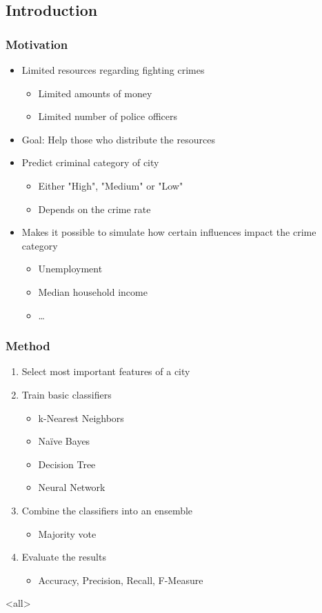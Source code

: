 \mode*

\begin{frame}
  \section{Introduction}
  \frametitle{Motivation}
  \begin{itemize}
    \item Limited resources regarding fighting crimes
      \begin{itemize}
        \item Limited amounts of money
        \item Limited number of police officers
      \end{itemize}
    \item Goal: Help those who distribute the resources
    \item Predict criminal category of city
      \begin{itemize}
        \item Either "High", "Medium" or "Low"
        \item Depends on the crime rate
      \end{itemize}
    \item Makes it possible to simulate how certain influences impact the crime category
      \begin{itemize}
        \item Unemployment
        \item Median household income
        \item \ldots
      \end{itemize}
  \end{itemize}
\end{frame}

\begin{frame}
  \frametitle{Method}
  \begin{enumerate}
    \item Select most important features of a city
    \item Train basic classifiers
      \begin{itemize}
        \item k-Nearest Neighbors
        \item Na\"ive Bayes
        \item Decision Tree
        \item Neural Network
      \end{itemize}
    \item Combine the classifiers into an ensemble
      \begin{itemize}
        \item Majority vote
      \end{itemize}
    \item Evaluate the results
      \begin{itemize}
        \item Accuracy, Precision, Recall, F-Measure
      \end{itemize}
  \end{enumerate}
\end{frame}

\mode<all>
